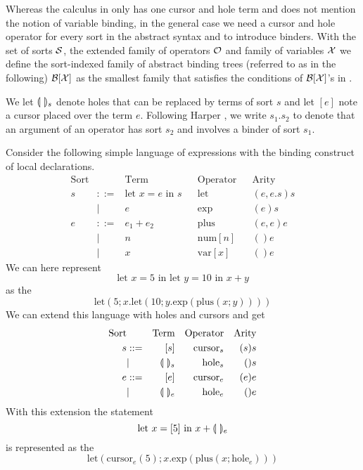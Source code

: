\documentclass[sigplan,screen]{acmart}
\begin{document}
Whereas the calculus in \cite{type_safe_structure_editor} only has one
cursor and hole term and does not mention the notion of variable
binding, in the general case we need a cursor and hole operator for
every sort in the abstract syntax and to introduce binders.  With the
set of sorts $\mathcal{S}$, the extended family of operators $\mathcal{O}$ and
family of variables $\mathcal{X}$ we define the sort-indexed family of
abstract binding trees (referred to as \abt in the following) $\mathcal{B}[\mathcal{X} ]$
as the smallest family that satisfies the conditions of $\mathcal{B}[\mathcal{X} ]$'s in
\cite{harper_foundations}.

We let $\llparenthesis \ \rrparenthesis_s$ denote holes that can be replaced by terms of sort
$s$ and let $[e]$ note a cursor placed over the term $e$. Following
Harper \cite{harper_foundations}, we write $s_1.s_2$ to denote that an
argument of an operator has sort $s_2$ and involves a binder of sort
$s_1$.

\begin{example}\label{ex:abstract_syntax}
Consider the following simple language of expressions with the binding
construct of local declarations.
\begin{align*}
  \text{Sort} && \text{Term} && \text{Operator} && \text{Arity} \\
        s & ::= & \text{let $x = e$ in $s$} && \text{let} && (e, e.s)s \\
        & | & e && \text{exp} && (e)s \\
  e & ::= & e_1 + e_2 && \text{plus} && (e,e)e \\
        & | & n && \text{num}[n] &&  ()e \\
        & | & x && \text{var}[x] && ()e
\end{align*}
 We can here represent
    \begin{equation*}
        \text{let $x=5$ in let $y=10$ in $x+y$}
    \end{equation*}
    as the \abt
    \begin{equation*}
        \text{let}(5;x.\text{let}(10;y.\text{exp}(\text{plus}(x;y))))
    \end{equation*}
%
    We can extend this language with holes and cursors and get
\begin{align*}
        \text{Sort} && \text{Term} && \text{Operator} && \text{Arity} \\
        s & ::= & [s] && \text{cursor}_s && (s)s \\
        & | & \llparenthesis \ \rrparenthesis_s && \text{hole}_s && ()s \\
        e & ::= & [e] && \text{cursor}_e && (e)e \\
        & | & \llparenthesis \ \rrparenthesis_e && \text{hole}_e && ()e
 \end{align*}
%
    With this extension the statement
    \begin{equation*}
        \text{let $x=[5]$ in $x+\llparenthesis \ \rrparenthesis_e$}
    \end{equation*}
    is represented as the \abt
    \begin{equation*}
        \text{let}(\text{cursor}_e(5); x.\text{exp}(\text{plus}(x;\text{hole}_e)))
    \end{equation*}
\end{example}
\end{document}
